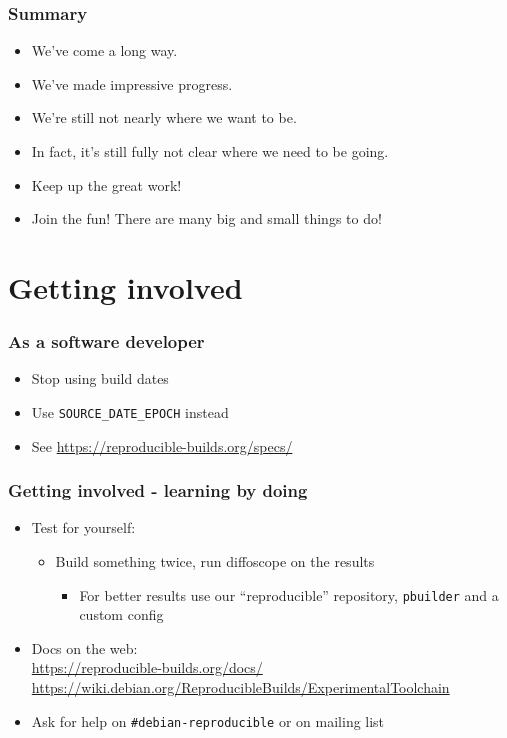 \documentclass[14pt]{beamer}
\begin{document}
\begin{frame}
 \frametitle{Summary}
 \begin{itemize}
  \item We've come a long way.
  \item We've made impressive progress.
  \item We're still not nearly where we want to be.
  \item<2-3> In fact, it's still fully not clear where we need to be going.
  \item<3> Keep up the great work!
  \item<3> Join the fun! There are many big and small things to do!
 \end{itemize}
\end{frame}


\section{Getting involved}

\begin{frame}
 \frametitle{As a software developer}
 \begin{itemize}
  \item Stop using build dates
  \item Use \texttt{SOURCE\_DATE\_EPOCH} instead
  \item See \url{https://reproducible-builds.org/specs/}
 \end{itemize}
\end{frame}

\begin{frame}
 \frametitle{Getting involved - learning by doing}

 \begin{itemize}
  \item Test for yourself:
   \begin{itemize}
    \item Build something twice, run diffoscope on the results
    \begin{itemize}
     \item For better results use our “reproducible” repository, \texttt{pbuilder} and a custom config
    \end{itemize}
   \end{itemize}
  \item Docs on the web: \\
    \small{\url{https://reproducible-builds.org/docs/}} \\
    \small{\url{https://wiki.debian.org/ReproducibleBuilds/ExperimentalToolchain}}
  \item Ask for help on \texttt{\#debian-reproducible} or on mailing list
 \end{itemize}
\end{frame}
\end{document}
